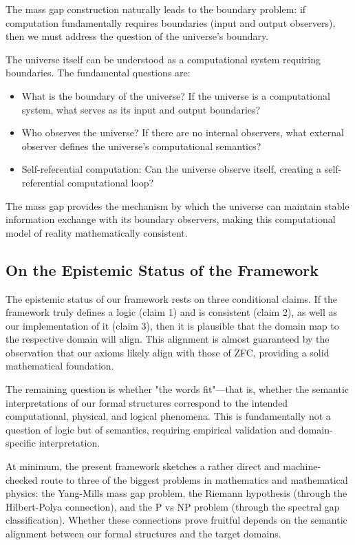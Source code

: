 \begin{theorem}
The mass gap construction naturally leads to the boundary problem: if computation fundamentally requires boundaries (input and output observers), then we must address the question of the universe's boundary.

\begin{conjecture}
\label{conj:universal-boundary}
The universe itself can be understood as a computational system requiring boundaries. The fundamental questions are:
\begin{itemize}
\item What is the boundary of the universe? If the universe is a computational system, what serves as its input and output boundaries?
\item Who observes the universe? If there are no internal observers, what external observer defines the universe's computational semantics?
\item Self-referential computation: Can the universe observe itself, creating a self-referential computational loop?
\end{itemize}
\end{conjecture}

The mass gap provides the mechanism by which the universe can maintain stable information exchange with its boundary observers, making this computational model of reality mathematically consistent.

\subsection{On the Epistemic Status of the Framework}

The epistemic status of our framework rests on three conditional claims. If the framework truly defines a logic (claim 1) and is consistent (claim 2), as well as our implementation of it (claim 3), then it is plausible that the domain map to the respective domain will align. This alignment is almost guaranteed by the observation that our axioms likely align with those of ZFC, providing a solid mathematical foundation.

The remaining question is whether "the words fit"—that is, whether the semantic interpretations of our formal structures correspond to the intended computational, physical, and logical phenomena. This is fundamentally not a question of logic but of semantics, requiring empirical validation and domain-specific interpretation.

At minimum, the present framework sketches a rather direct and machine-checked route to three of the biggest problems in mathematics and mathematical physics: the Yang-Mills mass gap problem, the Riemann hypothesis (through the Hilbert-Polya connection), and the P vs NP problem (through the spectral gap classification). Whether these connections prove fruitful depends on the semantic alignment between our formal structures and the target domains.


\end{theorem}
